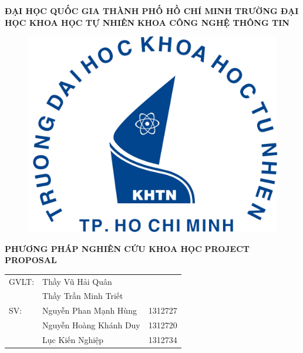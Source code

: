 \documentclass{article}
\begin{document}
	
	\begin{titlepage}
		\begin{center}
			\large{\textbf{ĐẠI HỌC QUỐC GIA THÀNH PHỐ HỒ CHÍ MINH}}
			\large{\textbf{TRƯỜNG ĐẠI HỌC KHOA HỌC TỰ NHIÊN}}
			\large{\textbf{KHOA CÔNG NGHỆ THÔNG TIN}}
			
			\begin{figure}[H]
				\centerline{\includegraphics[scale = 0.5]{logo}}
			\end{figure}
			
			\Large{\textbf{PHƯƠNG PHÁP NGHIÊN CỨU KHOA HỌC}}
			\Large{\textbf{PROJECT PROPOSAL}}
			
		\end{center}
		\vfill
		\begin{flushright}
			
			\begin{tabular}{l l l}
				GVLT: &Thầy Vũ Hải Quân&\\
				&Thầy Trần Minh Triết&\\
				SV: &Nguyễn Phan Mạnh Hùng&1312727\\
				&Nguyễn Hoàng Khánh Duy&1312720\\
				&Lục Kiến Nghiệp&1312734\\
			\end{tabular}
		\end{flushright}
		
		\vfill
	\end{titlepage}
	\pagebreak
\end{document}
